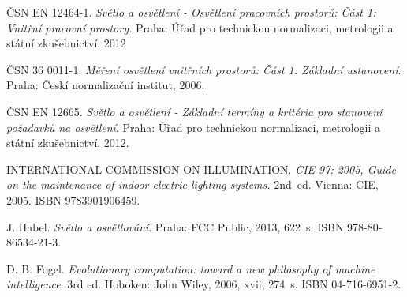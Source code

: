 \documentclass[Afour,sagev,times,doublespace]{sagej}
\begin{document}
\begin{thebibliography}{99}

\v{C}SN EN 12464-1. \textit{Sv\v{e}tlo a osv\v{e}tlen\'{i} - Osv\v{e}tlen\'{i} pracovn\'{i}ch prostor\r{u}: \v{C}\'{a}st 1: Vnit\v{r}n\'{i} pracovn\'{i} prostory.} Praha: \'{U}\v{r}ad pro technickou normalizaci, metrologii a st\'{a}tn\'{i} zku\v{s}ebnictv\'{i}, 2012

\v{C}SN 36 0011-1. \textit{M\v{e}\v{r}en\'{i} osv\v{e}tlen\'{i} vnit\v{r}n\'{i}ch prostor\r{u}: \v{C}\'{a}st 1: Z\'{a}kladn\'{i} ustanoven\'{i}}. Praha: \v{C}esk\'{i} normaliza\v{c}n\'{i} institut, 2006.


\v{C}SN EN 12665. \textit{Sv\v{e}tlo a osv\v{e}tlen\'{i} - Z\'{a}kladn\'{i} term\'{i}ny a krit\'{e}ria pro stanoven\'{i} po\v{z}adavk\r{u} na osv\v{e}tlen\'{i}}. Praha: \'{U}\v{r}ad pro technickou normalizaci, metrologii a st\'{a}tn\'{i} zku\v{s}ebnictv\'{i}, 2012.

INTERNATIONAL COMMISSION ON ILLUMINATION.\textit{ CIE 97: 2005, Guide on the maintenance of indoor electric lighting systems.} 2nd~ed. Vienna: CIE, 2005. ISBN 9783901906459.

J. Habel. \textit{Sv\v{e}tlo a osv\v{e}tlov\'{a}n\'{i}}. Praha: FCC Public, 2013, 622~s. ISBN 978-80-86534-21-3.

D. B. Fogel. \textit{Evolutionary computation: toward a new philosophy of machine intelligence}. 3rd ed. Hoboken: John Wiley, 2006, xvii, 274~s. ISBN 04-716-6951-2.

\end{thebibliography}
\end{document}
